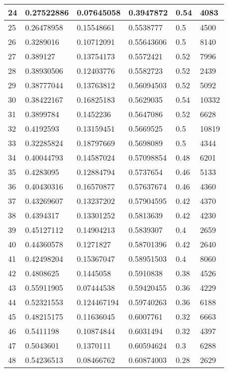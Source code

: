 \begin{longtable}{|l|l|l|l|l|l|}
24 & 0.27522886 & 0.07645058 & 0.3947872 & 0.54 & 4083 \\ \hline 
25 & 0.26478958 & 0.15548661 & 0.5538777 & 0.5 & 4500 \\ \hline 
26 & 0.3289016 & 0.10712091 & 0.55643606 & 0.5 & 8140 \\ \hline 
27 & 0.389127 & 0.13754173 & 0.5572421 & 0.52 & 7996 \\ \hline 
28 & 0.38930506 & 0.12403776 & 0.5582723 & 0.52 & 2439 \\ \hline 
29 & 0.38777044 & 0.13763812 & 0.56094503 & 0.52 & 5092 \\ \hline 
30 & 0.38422167 & 0.16825183 & 0.5629035 & 0.54 & 10332 \\ \hline 
31 & 0.3899784 & 0.1452236 & 0.5647086 & 0.52 & 6628 \\ \hline 
32 & 0.4192593 & 0.13159451 & 0.5669525 & 0.5 & 10819 \\ \hline 
33 & 0.32285824 & 0.18797669 & 0.5698089 & 0.5 & 4344 \\ \hline 
34 & 0.40044793 & 0.14587024 & 0.57098854 & 0.48 & 6201 \\ \hline 
35 & 0.4283095 & 0.12884794 & 0.5737654 & 0.46 & 5133 \\ \hline 
36 & 0.40430316 & 0.16570877 & 0.57637674 & 0.46 & 4360 \\ \hline 
37 & 0.43269607 & 0.13237202 & 0.57904595 & 0.42 & 4370 \\ \hline 
38 & 0.4394317 & 0.13301252 & 0.5813639 & 0.42 & 4230 \\ \hline 
39 & 0.45127112 & 0.14904213 & 0.5839307 & 0.4 & 2659 \\ \hline 
40 & 0.44360578 & 0.1271827 & 0.58701396 & 0.42 & 2640 \\ \hline 
41 & 0.42498204 & 0.15367047 & 0.58951503 & 0.4 & 8060 \\ \hline 
42 & 0.4808625 & 0.1445058 & 0.5910838 & 0.38 & 4526 \\ \hline 
43 & 0.55911905 & 0.07444538 & 0.59420455 & 0.36 & 4229 \\ \hline 
44 & 0.52321553 & 0.124467194 & 0.59740263 & 0.36 & 6188 \\ \hline 
45 & 0.48215175 & 0.11636045 & 0.6007761 & 0.32 & 6663 \\ \hline 
46 & 0.5411198 & 0.10874844 & 0.6031494 & 0.32 & 4397 \\ \hline 
47 & 0.5043601 & 0.1370111 & 0.60594624 & 0.3 & 6288 \\ \hline 
48 & 0.54236513 & 0.08466762 & 0.60874003 & 0.28 & 2629 \\ \hline 

\end{longtable}
